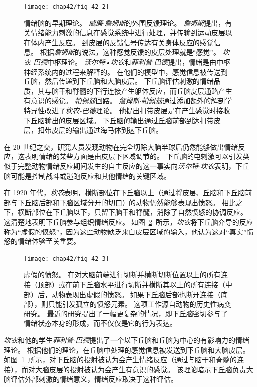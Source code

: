 \begin{figure}[htbp]
	\centering
	\texttt{[image: chap42/fig\_42\_2]}
	\caption{情绪脑的早期理论\cite{ledoux1997emotional}。
		\textit{威廉$\cdot$詹姆斯}的外围反馈理论。
		\textit{詹姆斯}提出，有关情绪能力刺激的信息在感觉系统中进行处理，并传输到运动皮层以在体内产生反应。
		到皮层的反馈信号传达有关身体反应的感觉信息。
		根据\textit{詹姆斯}的说法，这种感觉反馈的皮层处理就是“感觉”。
		\textit{坎农-巴德}中枢理论。
		\textit{沃尔特•坎农}和\textit{菲利普$\cdot$巴德}提出，情绪是由中枢神经系统内的过程来解释的。
		在他们的模型中，感觉信息被传送到丘脑，然后传递到下丘脑和大脑皮层。
		下丘脑评估刺激的情绪品质，其与脑干和脊髓的下行连接产生躯体反应，而丘脑皮层通路产生有意识的感觉。
		\textit{帕佩兹}回路。
		\textit{詹姆斯$\cdot$帕佩兹}通过添加额外的解剖学特异性改进了\textit{坎农-巴德}理论。
		他提出扣带皮层是在产生感觉时接收下丘脑输出的皮层区域。
		下丘脑的输出通过丘脑前部到达扣带皮层，扣带皮层的输出通过海马体到达下丘脑。}
	\label{fig:42_2}
\end{figure}


在 20 世纪之交，研究人员发现动物在完全切除大脑半球后仍然能够做出情绪反应，这表明情绪的某些方面是由皮层下区域调节的。
下丘脑的电刺激可以引发类似于完整动物情绪反应期间发生的自主反应的这一事实向\textit{沃尔特$\cdot$坎农}表明，下丘脑可能是控制战斗或逃跑反应和其他情绪的关键区域。


在 1920 年代，\textit{坎农}表明，横断部位在下丘脑以上（通过将皮层、丘脑和下丘脑前部与下丘脑后部和下脑区域分开的切口）的动物仍然能够表现出愤怒。
相比之下，横断部位在下丘脑以下，只留下脑干和脊髓，消除了自然愤怒的协调反应。
这清楚地表明下丘脑参与组织情绪反应。
如图~\ref{fig:42_3}~所示，\textit{坎农}将下丘脑介导的反应称为“虚假的愤怒”，因为这些动物缺乏来自皮层区域的输入，他认为这对“真实”愤怒的情绪体验至关重要。


\begin{figure}[htbp]
	\centering
	\texttt{[image: chap42/fig\_42\_3]}
	\caption{虚假的愤怒。
		在对大脑前端进行切断并横断切断位置以上的所有连接（顶部）或在前下丘脑水平进行切断并横断其以上的所有连接（中部）后，动物表现出虚假的愤怒。
		如果下丘脑后部也断开连接（底部），则只能引发孤立的愤怒元素。
		这项工作源自动物的历史性病变研究。
		最近的研究提出了一幅更复杂的情况，即下丘脑密切参与了情绪状态本身的形成，而不仅仅是它的行为表达。}
	\label{fig:42_3}
\end{figure}


\textit{坎农}和他的学生\textit{菲利普$\cdot$巴德}提出了一个以下丘脑和丘脑为中心的有影响力的情绪理论。
根据他们的理论，在丘脑中处理的感觉信息被发送到下丘脑和大脑皮层。
如图~\ref{fig:42_2}~所示，对下丘脑的投射被认为会产生情绪反应（通过与脑干和脊髓的连接），而对大脑皮层的投射被认为会产生有意识的感觉。
该理论暗示下丘脑负责大脑评估外部刺激的情绪意义，情绪反应取决于这种评估。


